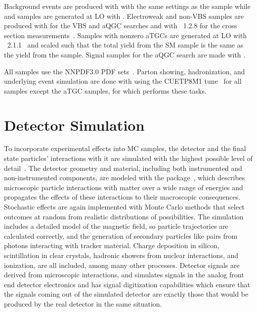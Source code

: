 Background {\WZ} events are produced with {\POWHEG} with the same settings as the {\ZZ} sample while {\TTZ} and {\WWZ} samples are generated at LO with {\MGAMC}.
Electroweak and non-VBS {\ZZjj} samples are produced with {\MGAMC} for the VBS and aQGC searches and with {\PHANTOM}~1.2.8 for the cross section measurements~\cite{Ballestrero:2007xq}.
Samples with nonzero aTGCs are generated at LO with {\SHERPA}~2.1.1~\cite{Gleisberg:2008ta} and scaled such that the total yield from the SM {\SHERPA} sample is the same as the yield from the {\POWHEG} {\ZZ} sample.
Signal samples for the aQGC search are made with {\MGAMC}.

All samples use the NNPDF3.0 PDF sets~\cite{Ball:2014uwa}.
Parton showing, hadronization, and underlying event simulation are done with {\PYTHIA} using the CUETP8M1 tune~\cite{Khachatryan:2015pea} for all samples except the aTGC samples, for which {\SHERPA} performs these tasks.


\section{Detector Simulation}

To incorporate experimental effects into MC samples, the detector and the final state particles' interactions with it are simulated with the highest possible level of detail~\cite{Banerjee:1742-6596-396-2-022003, Hildreth:1742-6596-664-7-072022}.
The detector geometry and material, including both instrumented and non-instrumented components, are modeled with the {\GEANTfour} package~\cite{Agostinelli:2002hh}, which describes microscopic particle interactions with matter over a wide range of energies and propagates the effects of these interactions to their macroscopic consequences.
Stochastic effects are again implemented with Monte Carlo methods that select outcomes at random from realistic distributions of possibilities.
The {\GEANTfour} simulation includes a detailed model of the magnetic field, so particle trajectories are calculated correctly, and the generation of secondary particles like {\epem} pairs from photons interacting with tracker material.
Charge deposition in silicon, scintillation in clear crystals, hadronic showers from nuclear interactions, and ionization, are all included, among many other processes.
Detector signals are derived from microscopic interactions, and {\GEANTfour} simulates signals in the analog front end detector electronics and has signal digitization capabilities which ensure that the signals coming out of the simulated detector are exactly those that would be produced by the real detector in the same situation.

